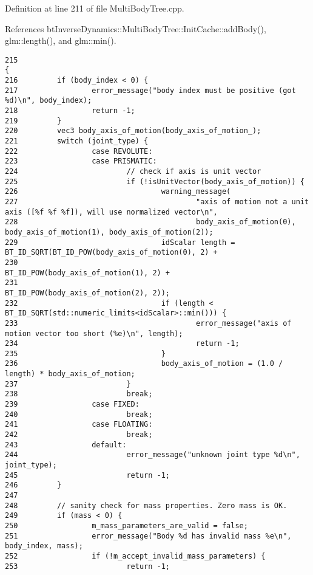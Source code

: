 Definition at line 211 of file MultiBodyTree.cpp.

References btInverseDynamics::MultiBodyTree::InitCache::addBody(), glm::length(), and glm::min().

\begin{Code}\begin{verbatim}215                                                                                        {
216         if (body_index < 0) {
217                 error_message("body index must be positive (got %d)\n", body_index);
218                 return -1;
219         }
220         vec3 body_axis_of_motion(body_axis_of_motion_);
221         switch (joint_type) {
222                 case REVOLUTE:
223                 case PRISMATIC:
224                         // check if axis is unit vector
225                         if (!isUnitVector(body_axis_of_motion)) {
226                                 warning_message(
227                                         "axis of motion not a unit axis ([%f %f %f]), will use normalized vector\n",
228                                         body_axis_of_motion(0), body_axis_of_motion(1), body_axis_of_motion(2));
229                                 idScalar length = BT_ID_SQRT(BT_ID_POW(body_axis_of_motion(0), 2) +
230                                                                            BT_ID_POW(body_axis_of_motion(1), 2) +
231                                                                            BT_ID_POW(body_axis_of_motion(2), 2));
232                                 if (length < BT_ID_SQRT(std::numeric_limits<idScalar>::min())) {
233                                         error_message("axis of motion vector too short (%e)\n", length);
234                                         return -1;
235                                 }
236                                 body_axis_of_motion = (1.0 / length) * body_axis_of_motion;
237                         }
238                         break;
239                 case FIXED:
240                         break;
241                 case FLOATING:
242                         break;
243                 default:
244                         error_message("unknown joint type %d\n", joint_type);
245                         return -1;
246         }
247 
248         // sanity check for mass properties. Zero mass is OK.
249         if (mass < 0) {
250                 m_mass_parameters_are_valid = false;
251                 error_message("Body %d has invalid mass %e\n", body_index, mass);
252                 if (!m_accept_invalid_mass_parameters) {
253                         return -1;

\end{verbatim}
\end{Code}
